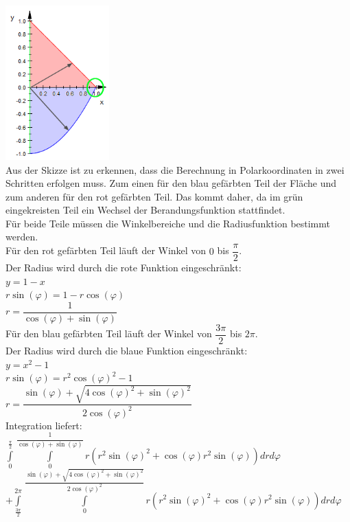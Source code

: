 \documentclass[11pt,final]{scrreprt}
\begin{document}
\includegraphics[width=4cm]{images/flaechenintegral/a1Skizze4.png}\\

Aus der Skizze ist zu erkennen, dass die Berechnung in Polarkoordinaten in zwei Schritten erfolgen muss. Zum einen für den blau gefärbten Teil der Fläche und zum anderen für den rot gefärbten Teil. Das kommt daher, da im grün eingekreisten Teil ein Wechsel der Berandungsfunktion stattfindet.\\
Für beide Teile müssen die Winkelbereiche und die Radiusfunktion bestimmt werden.\\

Für den rot gefärbten Teil läuft der Winkel von $0$ bis $\dfrac{\pi}{2}$.\\
Der Radius wird durch die rote Funktion eingeschränkt:\\
$y=1-x$\\
$r\sin(\varphi) = 1-r\cos(\varphi)$\\
$r = \dfrac{1}{\cos(\varphi)+\sin(\varphi)}$\\

Für den blau gefärbten Teil läuft der Winkel von $\dfrac{3\pi}{2}$ bis $2\pi$.\\
Der Radius wird durch die blaue Funktion eingeschränkt:\\
$y=x^2-1$\\
$r\sin(\varphi) = r^2\cos(\varphi)^2-1$\\
$r = \dfrac{\sin(\varphi)+\sqrt{4\cos(\varphi)^2+\sin(\varphi)^2}}{2\cos(\varphi)^2}$\\

Integration liefert:\\

$ \int\limits_{0}^{\frac{\pi}{2}}\int\limits_{0}^{\dfrac{1}{\cos(\varphi)+\sin(\varphi)}} r(r^2\sin(\varphi)^2+\cos(\varphi)r^2\sin(\varphi)) dr d\varphi$\\

$+ \int\limits_{\frac{3\pi}{2}}^{2\pi}\int\limits_{0}^{\dfrac{\sin(\varphi)+\sqrt{4\cos(\varphi)^2+\sin(\varphi)^2}}{2\cos(\varphi)^2}} r(r^2\sin(\varphi)^2+\cos(\varphi)r^2\sin(\varphi)) dr d\varphi$\\
\end{document}
